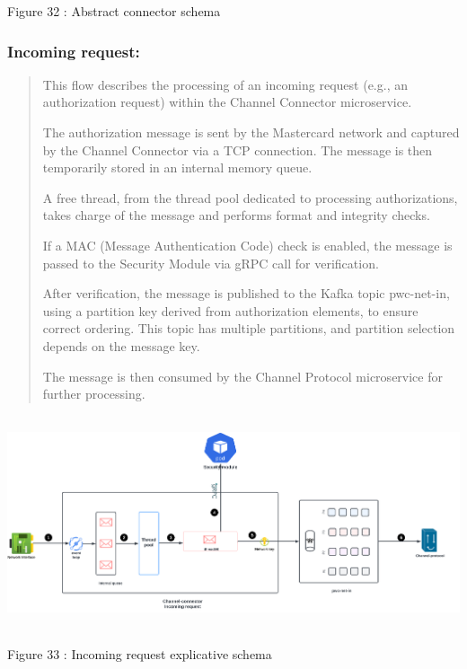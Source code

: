 \documentclass[12pt,a4paper]{report}
\begin{document}
\protect\hypertarget{_Toc201954508}{}{}Figure 32 : Abstract connector
schema

\hypertarget{incoming-request}{%
\subsubsection{\texorpdfstring{\textbf{Incoming
request:}}{Incoming request:}}\label{incoming-request}}

\begin{quote}
This flow describes the processing of an incoming request (e.g., an
authorization request) within the Channel Connector microservice.

The authorization message is sent by the Mastercard network and captured
by the Channel Connector via a TCP connection. The message is then
temporarily stored in an internal memory queue.

A free thread, from the thread pool dedicated to processing
authorizations, takes charge of the message and performs format and
integrity checks.

If a MAC (Message Authentication Code) check is enabled, the message is
passed to the Security Module via gRPC call for verification.

After verification, the message is published to the Kafka topic
pwc-net-in, using a partition key derived from authorization elements,
to ensure correct ordering. This topic has multiple partitions, and
partition selection depends on the message key.

The message is then consumed by the Channel Protocol microservice for
further processing.
\end{quote}

\includegraphics[width=6.22725in,height=2.48059in]{vertopal_d1b0b2209edd4c6aa8254f57daa0953b/media/image52.png}

\protect\hypertarget{_Toc201954509}{}{}Figure 33 : Incoming request
explicative schema
\end{document}
